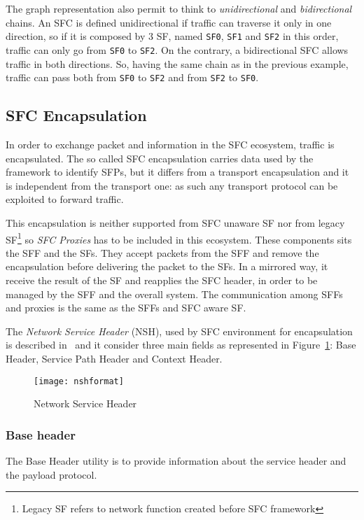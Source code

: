 The graph representation also permit to think to \emph{unidirectional} and
\emph{bidirectional} chains. An SFC is defined unidirectional if traffic can
traverse it only in one direction, so if it is composed by 3 SF, named
\texttt{SF0}, \texttt{SF1} and \texttt{SF2} in this order, traffic can only go
from \texttt{SF0} to \texttt{SF2}. On the contrary, a bidirectional SFC allows
traffic in both directions. So, having the same chain as in the previous
example, traffic can pass both from \texttt{SF0} to \texttt{SF2} and from
\texttt{SF2} to \texttt{SF0}.

\subsection{SFC Encapsulation}
In order to exchange packet and information in the SFC ecosystem, traffic is
encapsulated. The so called SFC encapsulation carries data used by the
framework to identify SFPs, but it differs from a transport encapsulation and it
is independent from the transport one: as such any transport protocol can be
exploited to forward traffic.

This encapsulation is neither supported from SFC unaware SF nor from legacy 
SF\footnote{Legacy SF refers to network function created before SFC framework}
so \emph{SFC Proxies} has to be included in this ecosystem. These components
sits the SFF and the SFs. They accept packets from the SFF and remove the
encapsulation before delivering the packet to the SFs. In a mirrored way, it
receive the result of the SF and reapplies the SFC header, in order to be
managed by the SFF and the overall system. The communication among SFFs and
proxies is the same as the SFFs and SFC aware SF.

The \emph{Network Service Header} (NSH), used by SFC environment for
encapsulation is described in~\cite{rfc8300} and it consider three main fields
as represented in Figure~\ref{chap:background:img:nshformat}: Base Header,
Service Path Header and Context Header.
\begin{figure}[H]
  \centering
  \texttt{[image: nshformat]}
  \caption{Network Service Header~\cite{rfc8300}}
  \label{chap:background:img:nshformat}
\end{figure}

\subsubsection{Base header}
The Base Header utility is to provide information about the service header and
the payload protocol.

